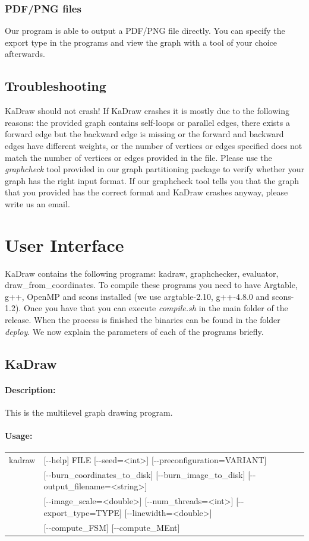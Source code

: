 \documentclass[11pt]{article}
\begin{document}
\subsubsection{PDF/PNG files}
Our program is able to output a PDF/PNG file directly. You can specify the export type in the programs and view the graph with a tool of your choice afterwards.
\subsection{Troubleshooting}
KaDraw should not crash! If KaDraw crashes it is mostly due to the following reasons: the provided graph contains self-loops or parallel edges, there exists a forward edge but the backward edge is missing or the forward and backward edges have different weights, or the number of vertices or edges specified does not match the number of vertices or edges provided in the file.
Please use the \emph{graphcheck} tool provided in our graph partitioning package to verify whether your graph has the right input format. If our graphcheck tool tells you that the graph that you provided has the correct format and KaDraw crashes anyway, please write us an email.

\vfill
\pagebreak
\section{User Interface}
KaDraw contains the following programs: kadraw, graphchecker, evaluator, draw\_from\_coordinates. To compile these programs you need to have Argtable, g++, OpenMP and scons installed (we use argtable-2.10, g++-4.8.0 and scons-1.2). Once you have that you can execute \emph{compile.sh} in the main folder of the release. When the process is finished the binaries can be found in the folder \emph{deploy}. We now explain the parameters of each of the programs briefly.
\subsection{KaDraw}
\paragraph*{Description:} This is the multilevel graph drawing program. 
\paragraph*{Usage:\\} 

\begin{tabular}{ll}
kadraw &   [-{}-help] FILE [-{}-seed=<int>] [-{}-preconfiguration=VARIANT]  \\
& [-{}-burn\_coordinates\_to\_disk] [-{}-burn\_image\_to\_disk] [-{}-output\_filename=<string>] \\ 
& [-{}-image\_scale=<double>] [-{}-num\_threads=<int>] [-{}-export\_type=TYPE] [-{}-linewidth=<double>] \\ 
& [-{}-compute\_FSM] [-{}-compute\_MEnt]

\end{tabular}
                          
\end{document}
